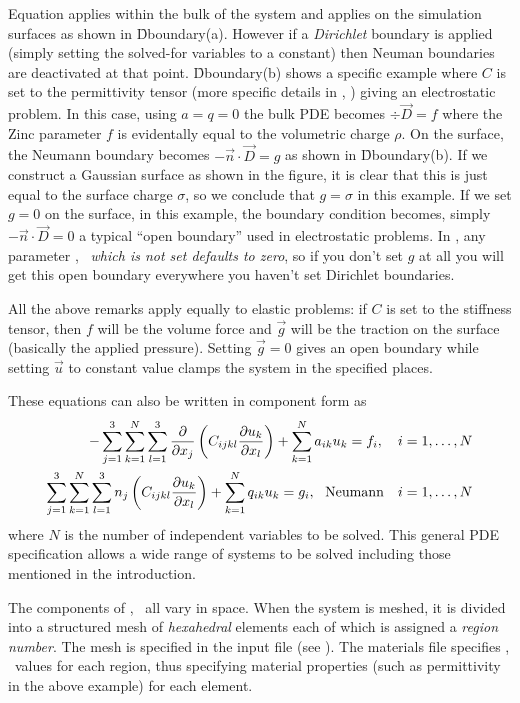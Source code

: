 \documentclass[a4paper,twoside,11pt]{book}
\begin{document}
Equation  applies within the bulk of the system and 
applies on the simulation surfaces as shown in
\f{Dboundary}(a). However if a \emph{Dirichlet} boundary is applied
(simply setting the solved-for variables to a constant) then Neuman
boundaries are deactivated at that point. \f{Dboundary}(b) shows a
specific example where $C$ is set to the permittivity tensor (more
specific details in , ) giving an
electrostatic problem. In this case, using $a=q=0$ the bulk PDE
becomes $\div \vec D=f$ where the Zinc parameter $f$ is evidentally equal
to the volumetric charge $\rho$. On the surface, the Neumann boundary
becomes $-\vec n\cdot\vec D=g$ as shown in \f{Dboundary}(b). If we
construct a Gaussian surface as shown in the figure, it is clear that
this is just equal to the surface charge $\sigma$, so we conclude that
$g=\sigma$ in this example. If we set $g=0$ on the surface, in this
example, the boundary condition becomes, simply $-\vec n\cdot\vec D=0$
a typical ``open boundary'' used in electrostatic problems. In \zinc,
any parameter \caf, \qg\ \emph{which is not set defaults to zero}, so if you
don't set $g$ at all you will get this open boundary everywhere you
haven't set Dirichlet boundaries.

All the above remarks apply equally to elastic problems: if $C$ is set
to the stiffness tensor, then $f$ will be the volume force and $\vec
g$ will be the traction on the surface (basically the applied
pressure). Setting $\vec g=0$ gives an open boundary while setting
$\vec u$ to constant value clamps the system in the specified places.

These equations can also be written in component form as
\begin{eqnarray}
    -\sum_{j=1}^3\sum_{k=1}^N\sum_{l=1}^3
\frac{\partial}{\partial x_j}\left(C_{ijkl} \frac{\partial u_k}{\partial x_l}\right)
+\sum_{k=1}^N a_{ik}u_k=f_i,~~~i=1,\ldots,N\\
  \sum_{j=1}^3\sum_{k=1}^N\sum_{l=1}^3 n_j 
\left(C_{ijkl} \frac{\partial u_k}{\partial x_l}\right)
+\sum_{k=1}^N q_{ik}u_k=g_i,~~\mathrm{Neumann}~~~i=1,\ldots,N
\end{eqnarray}
where $N$ is the number of independent variables to be solved. This
general PDE specification allows a wide range of systems to be solved
including those mentioned in the introduction.

The components of \caf, \qg\ all vary in space. When the system is meshed,
it is divided into a structured mesh of \emph{hexahedral} elements
each of which is assigned a \emph{region number}. The mesh is
specified in the input file  (see ). The materials file
 specifies \caf, \qg\ values for each region, thus specifying
material properties (such as permittivity in the above example) for
each element.
\end{document}
